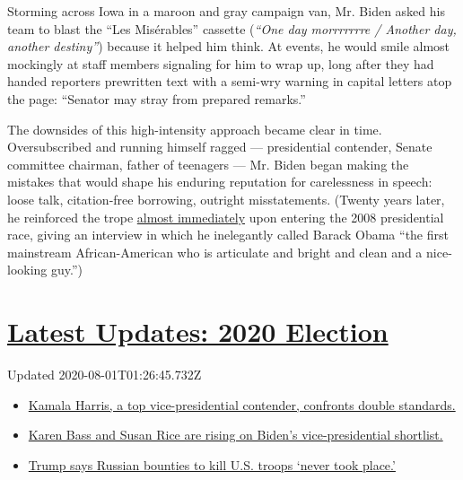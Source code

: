 Storming across Iowa in a maroon and gray campaign van, Mr. Biden asked
his team to blast the ``Les Misérables'' cassette (\emph{``One day
morrrrrrre / Another day, another destiny''}) because it helped him
think. At events, he would smile almost mockingly at staff members
signaling for him to wrap up, long after they had handed reporters
prewritten text with a semi-wry warning in capital letters atop the
page: ``Senator may stray from prepared remarks.''

The downsides of this high-intensity approach became clear in time.
Oversubscribed and running himself ragged --- presidential contender,
Senate committee chairman, father of teenagers --- Mr. Biden began
making the mistakes that would shape his enduring reputation for
carelessness in speech: loose talk, citation-free borrowing, outright
misstatements. (Twenty years later, he reinforced the trope
\href{https://www.nytimes.com/2007/02/01/us/politics/01biden.html}{almost
immediately} upon entering the 2008 presidential race, giving an
interview in which he inelegantly called Barack Obama ``the first
mainstream African-American who is articulate and bright and clean and a
nice-looking guy.'')

\hypertarget{latest-updates-2020-election}{%
\section{\texorpdfstring{\href{https://www.nytimes.com/2020/07/31/us/elections/biden-vs-trump.html?action=click\&pgtype=Article\&state=default\&region=MAIN_CONTENT_1\&context=storylines_live_updates}{Latest
Updates: 2020
Election}}{Latest Updates: 2020 Election}}\label{latest-updates-2020-election}}

Updated 2020-08-01T01:26:45.732Z

\begin{itemize}
\tightlist
\item
  \href{https://www.nytimes.com/2020/07/31/us/elections/biden-vs-trump.html?action=click\&pgtype=Article\&state=default\&region=MAIN_CONTENT_1\&context=storylines_live_updates\#link-29fdff45}{Kamala
  Harris, a top vice-presidential contender, confronts double
  standards.}
\item
  \href{https://www.nytimes.com/2020/07/31/us/elections/biden-vs-trump.html?action=click\&pgtype=Article\&state=default\&region=MAIN_CONTENT_1\&context=storylines_live_updates\#link-13ec3d9c}{Karen
  Bass and Susan Rice are rising on Biden's vice-presidential
  shortlist.}
\item
  \href{https://www.nytimes.com/2020/07/31/us/elections/biden-vs-trump.html?action=click\&pgtype=Article\&state=default\&region=MAIN_CONTENT_1\&context=storylines_live_updates\#link-49e9a016}{Trump
  says Russian bounties to kill U.S. troops `never took place.'}
\end{itemize}


